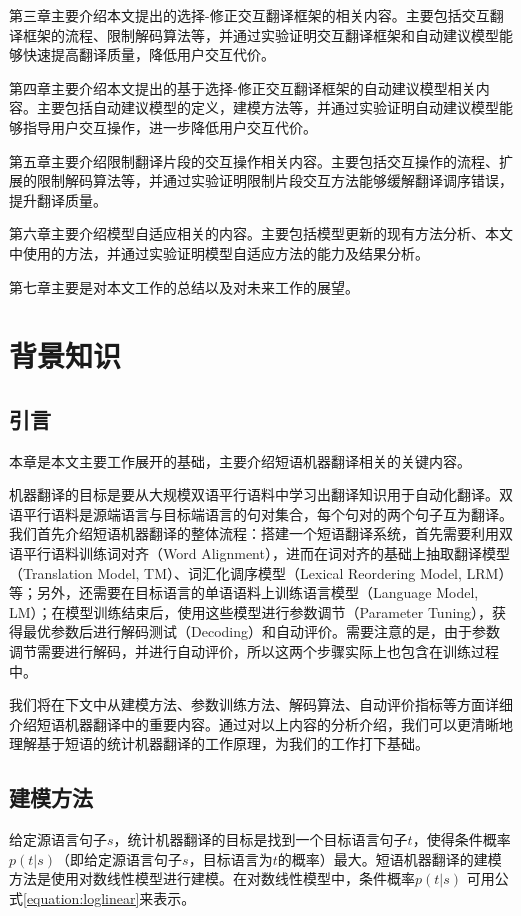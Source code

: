 \documentclass[master, winfont]{njuthesis}
\begin{document}
第三章主要介绍本文提出的选择-修正交互翻译框架的相关内容。主要包括交互翻译框架的流程、限制解码算法等，并通过实验证明交互翻译框架和自动建议模型能够快速提高翻译质量，降低用户交互代价。

第四章主要介绍本文提出的基于选择-修正交互翻译框架的自动建议模型相关内容。主要包括自动建议模型的定义，建模方法等，并通过实验证明自动建议模型能够指导用户交互操作，进一步降低用户交互代价。

第五章主要介绍限制翻译片段的交互操作相关内容。主要包括交互操作的流程、扩展的限制解码算法等，并通过实验证明限制片段交互方法能够缓解翻译调序错误，提升翻译质量。

第六章主要介绍模型自适应相关的内容。主要包括模型更新的现有方法分析、本文中使用的方法，并通过实验证明模型自适应方法的能力及结果分析。

第七章主要是对本文工作的总结以及对未来工作的展望。
\chapter{背景知识}
\section{引言}
本章是本文主要工作展开的基础，主要介绍短语机器翻译相关的关键内容。

机器翻译的目标是要从大规模双语平行语料中学习出翻译知识用于自动化翻译。双语平行语料是源端语言与目标端语言的句对集合，每个句对的两个句子互为翻译。我们首先介绍短语机器翻译的整体流程：搭建一个短语翻译系统，首先需要利用双语平行语料训练词对齐（Word Alignment），进而在词对齐的基础上抽取翻译模型（Translation Model, TM）、词汇化调序模型（Lexical Reordering Model, LRM）等；另外，还需要在目标语言的单语语料上训练语言模型（Language Model, LM）；在模型训练结束后，使用这些模型进行参数调节（Parameter Tuning），获得最优参数后进行解码测试（Decoding）和自动评价。需要注意的是，由于参数调节需要进行解码，并进行自动评价，所以这两个步骤实际上也包含在训练过程中。

我们将在下文中从建模方法、参数训练方法、解码算法、自动评价指标等方面详细介绍短语机器翻译中的重要内容。通过对以上内容的分析介绍，我们可以更清晰地理解基于短语的统计机器翻译的工作原理，为我们的工作打下基础。

\section{建模方法}\label{section:modeling}
给定源语言句子$s$，统计机器翻译的目标是找到一个目标语言句子$t$，使得条件概率$p(t|s)$（即给定源语言句子$s$，目标语言为$t$的概率）最大。短语机器翻译的建模方法是使用对数线性模型进行建模\cite{och2002discriminative}。在对数线性模型中，条件概率$p(t|s)$ 可用公式\ref{equation:loglinear}来表示。
\end{document}
